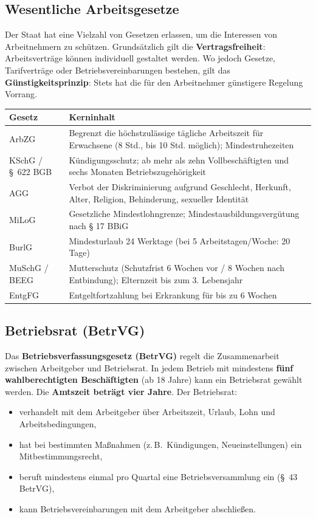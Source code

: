 \documentclass[11pt, a4paper]{article}
\begin{document}
\subsection{Wesentliche Arbeitsgesetze}

Der Staat hat eine Vielzahl von Gesetzen erlassen, um die Interessen von Arbeitnehmern zu
schützen. Grundsätzlich gilt die \textbf{Vertragsfreiheit}: Arbeitsverträge können individuell
gestaltet werden. Wo jedoch Gesetze, Tarifverträge oder Betriebsvereinbarungen bestehen,
gilt das \textbf{Günstigkeitsprinzip}: Stets hat die für den Arbeitnehmer günstigere Regelung
Vorrang.

\begin{center}
\begin{tabular}{p{4cm} p{9cm}}
\toprule
\textbf{Gesetz} & \textbf{Kerninhalt}\\
\midrule
ArbZG & Begrenzt die höchstzulässige tägliche Arbeitszeit für Erwachsene (8 Std., bis 10 Std. möglich); Mindestruhezeiten\\
KSchG / §~622 BGB & Kündigungsschutz; ab mehr als zehn Vollbeschäftigten und sechs Monaten Betriebszugehörigkeit\\
AGG & Verbot der Diskriminierung aufgrund Geschlecht, Herkunft, Alter, Religion, Behinderung, sexueller Identität\\
MiLoG & Gesetzliche Mindestlohngrenze; Mindestausbildungsvergütung nach § 17 BBiG\\
BurlG & Mindesturlaub 24 Werktage (bei 5 Arbeitstagen/Woche: 20 Tage)\\
MuSchG / BEEG & Mutterschutz (Schutzfrist 6 Wochen vor / 8 Wochen nach Entbindung); Elternzeit bis zum 3. Lebensjahr\\
EntgFG & Entgeltfortzahlung bei Erkrankung für bis zu 6 Wochen\\
\bottomrule
\end{tabular}
\end{center}

\subsection{Betriebsrat (BetrVG)}

Das \textbf{Betriebsverfassungsgesetz (BetrVG)} regelt die Zusammenarbeit zwischen
Arbeitgeber und Betriebsrat. In jedem Betrieb mit mindestens \textbf{fünf wahlberechtigten
Beschäftigten} (ab 18 Jahre) kann ein Betriebsrat gewählt werden. Die
\textbf{Amtszeit beträgt vier Jahre}. Der Betriebsrat:

\begin{itemize}
  \item verhandelt mit dem Arbeitgeber über Arbeitszeit, Urlaub, Lohn und Arbeitsbedingungen,
  \item hat bei bestimmten Maßnahmen (z.\,B.\ Kündigungen, Neueinstellungen) ein
    Mitbestimmungsrecht,
  \item beruft mindestens einmal pro Quartal eine Betriebsversammlung ein (§~43 BetrVG),
  \item kann Betriebsvereinbarungen mit dem Arbeitgeber abschließen.
\end{itemize}
\end{document}
